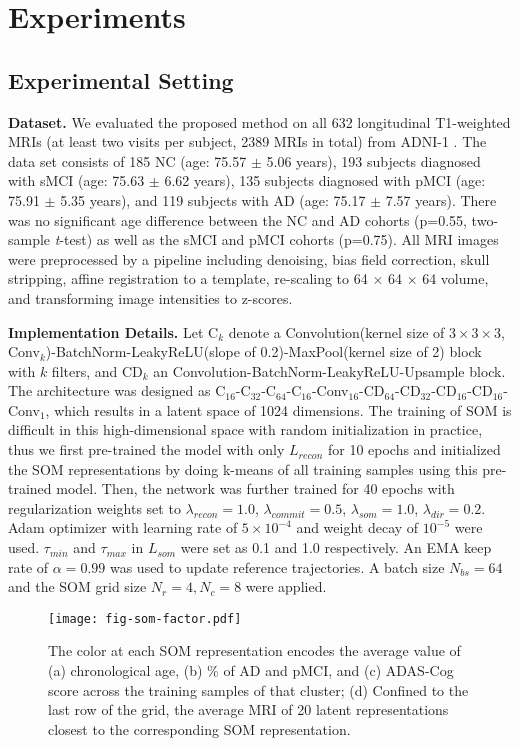 \documentclass[runningheads]{llncs}
\begin{document}
\section{Experiments}
\subsection{Experimental Setting}
\noindent\textbf{Dataset.} We evaluated the proposed method on all 632 longitudinal T1-weighted MRIs (at least two visits per subject, 2389 MRIs in total) from ADNI-1 \cite{petersen2010alzheimer}. The data set consists of 185 NC (age: 75.57 $\pm$ 5.06 years), 193 subjects diagnosed with sMCI (age: 75.63 $\pm$ 6.62 years), 135 subjects diagnosed with pMCI (age: 75.91 $\pm$ 5.35 years), and 119 subjects with AD (age: 75.17 $\pm$ 7.57 years). There was no significant age difference between the NC and AD cohorts (p=0.55, two-sample \textit{t}-test) as well as the sMCI and pMCI cohorts (p=0.75). All MRI images were preprocessed by a pipeline including denoising, bias field correction, skull stripping, affine registration to a template, re-scaling to 64 $\times$ 64 $\times$ 64 volume, and transforming image intensities to z-scores.

\noindent\textbf{Implementation Details.} Let C$_k$ denote a Convolution(kernel size of $3\times3\times3$, Conv$_k$)-BatchNorm-LeakyReLU(slope of 0.2)-MaxPool(kernel size of 2) block with $k$ filters, and CD$_k$ an Convolution-BatchNorm-LeakyReLU-Upsample block. The architecture was designed as C$_{16}$-C$_{32}$-C$_{64}$-C$_{16}$-Conv$_{16}$-CD$_{64}$-CD$_{32}$-CD$_{16}$-CD$_{16}$-Conv$_{1}$, which results in a latent space of 1024 dimensions. The training of SOM is difficult in this high-dimensional space with random initialization in practice, thus we first pre-trained the model with only $L_{recon}$ for 10 epochs and initialized the SOM representations by doing k-means of all training samples using this pre-trained model. Then, the network was further trained for 40 epochs with regularization weights set to $\lambda_{recon}=1.0$, $\lambda_{commit}=0.5$, $\lambda_{som}=1.0$, $\lambda_{dir}=0.2$. Adam optimizer with learning rate of $5 \times 10^{-4}$ and weight decay of $10^{-5}$ were used. $\tau_{min}$ and $\tau_{max}$ in $L_{som}$ were set as 0.1 and 1.0 respectively. An EMA keep rate of $\alpha=0.99$ was used to update reference trajectories. A batch size $N_{bs}=64$ and the SOM grid size $N_r=4, N_c=8$ were applied. 

\begin{figure}[!t]
\centering
\texttt{[image: fig-som-factor.pdf]}
\caption{The color at each SOM representation encodes the average value of (a) chronological age, (b) \% of AD and pMCI, and (c) ADAS-Cog score across  the training samples of that cluster; (d) Confined to the last row of the grid, the average MRI of 20 latent representations closest to the corresponding SOM representation.} 
\label{fig:som-factor}
\end{figure}
\end{document}
